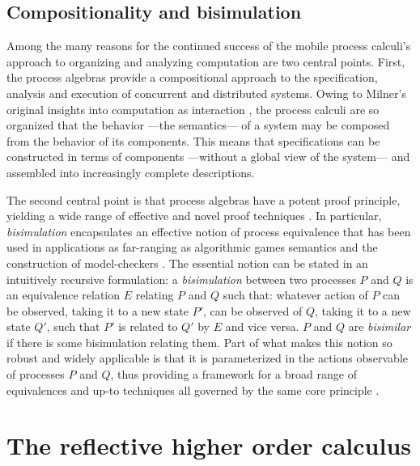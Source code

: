 \subsection{Compositionality and bisimulation}
Among the many reasons for the continued success of the mobile process
calculi's approach to organizing and analyzing computation are two
central points. First, the process algebras provide a compositional
approach to the specification, analysis and execution of concurrent
and distributed systems. Owing to Milner's original insights into
computation as interaction \cite{DBLP:journals/cacm/Milner93}, the
process calculi are so organized that the behavior ---the semantics---
of a system may be composed from the behavior of its components. This
means that specifications can be constructed in terms of components
---without a global view of the system--- and assembled into
increasingly complete descriptions.

The second central point is that process algebras have a potent proof
principle, yielding a wide range of effective and novel proof
techniques \cite{DBLP:conf/concur/SangiorgiM92}
\cite{DBLP:conf/fmco/Sangiorgi05}
\cite{DBLP:journals/toplas/Sangiorgi09}. In particular,
\emph{bisimulation} encapsulates an effective notion of process
equivalence that has been used in applications as far-ranging as
algorithmic games semantics \cite{DBLP:conf/sas/Abramsky05} and the
construction of model-checkers \cite{caires_2004}. The essential
notion can be stated in an intuitively recursive formulation: a
\emph{bisimulation} between two processes $P$ and $Q$ is an
equivalence relation $E$ relating $P$ and $Q$ such that: whatever
action of $P$ can be observed, taking it to a new state $P'$, can be
observed of $Q$, taking it to a new state $Q'$, such that $P'$ is
related to $Q'$ by $E$ and vice versa. $P$ and $Q$ are
\emph{bisimilar} if there is some bisimulation relating them. Part of
what makes this notion so robust and widely applicable is that it is
parameterized in the actions observable of processes $P$ and $Q$, thus
providing a framework for a broad range of equivalences and up-to
techniques \cite{DBLP:conf/concur/SangiorgiM92} all governed by the
same core principle \cite{DBLP:journals/toplas/Sangiorgi09}.

\section{The reflective higher order calculus}

